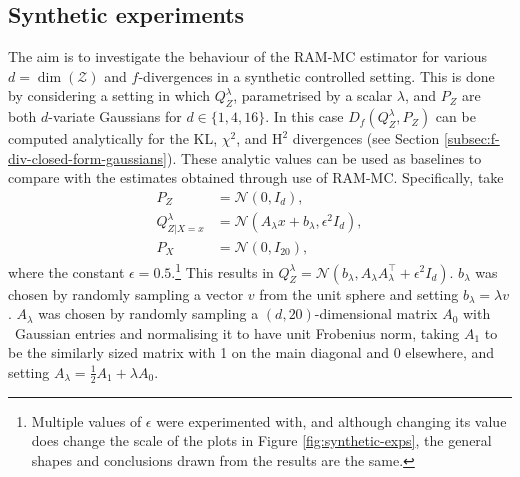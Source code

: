 \subsection{Synthetic experiments}\label{section:synth-exps}
The aim is to investigate the behaviour of the RAM-MC estimator for various $d=\dim(\mathcal{Z})$ and $f$-divergences in a synthetic controlled setting. 
This is done by considering a setting in which $Q^{\lambda}_Z$, parametrised by a scalar $\lambda$, and $P_Z$ are both $d$-variate Gaussians for $d\in\{1, 4, 16\}$.
In this case $D_f(Q^\lambda_Z, P_Z)$ can be computed analytically for the KL, $\chi^2$, and $\mathrm{H}^2$ divergences (see Section \ref{subsec:f-div-closed-form-gaussians}).
These analytic values can be used as baselines to compare with the estimates obtained through use of RAM-MC. 
Specifically, take 
\begin{align*}
P_Z &= \mathcal{N}(0, I_d), \\
Q^\lambda_{Z|X=x} &= \mathcal{N}\left(A_\lambda x + b_\lambda, \epsilon^2 I_d \right), \\
P_X &= \mathcal{N}\left(0, I_{20} \right),
\end{align*}
where the constant $\epsilon=0.5$.\footnote{Multiple values of $\epsilon$ were experimented with, and although changing its value does change the scale of the plots in Figure \ref{fig:synthetic-exps}, the general shapes and conclusions drawn from the results are the same.}
This results in $Q^\lambda_Z = \mathcal{N}\left(b_\lambda,  A_\lambda A_\lambda^\intercal + \epsilon^2 I_d \right)$. 
$b_\lambda$ was chosen by randomly sampling a vector $v$ from the unit sphere and setting $b_\lambda = \lambda v$. 
$A_\lambda$ was chosen by randomly sampling a $(d,20)$-dimensional matrix $A_0$ with \iid~Gaussian entries and normalising it to have unit Frobenius norm, taking $A_1$ to be the similarly sized matrix with 1 on the main diagonal and 0 elsewhere, and setting $A_\lambda = \frac{1}{2}A_1 + \lambda A_0$.

